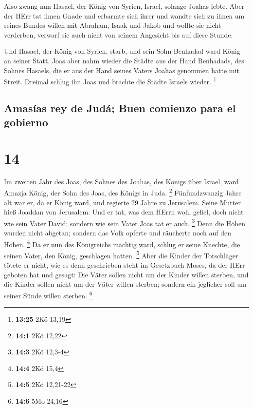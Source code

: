  Also zwang nun Hasael, der König von Syrien, Israel,
solange Joahas lebte.  Aber der HErr tat ihnen Gnade und
erbarmte sich ihrer und wandte sich zu ihnen um seines Bundes willen mit
Abraham, Isaak und Jakob und wollte sie nicht verderben, verwarf sie
auch nicht von seinem Angesicht bis auf diese Stunde.

 Und Hasael, der König von Syrien, starb, und sein Sohn
Benhadad ward König an seiner Statt.  Joas aber nahm
wieder die Städte aus der Hand Benhadads, des Sohnes Hasaels, die er aus
der Hand seines Vaters Joahas genommen hatte mit Streit. Dreimal schlug
ihn Joas und brachte die Städte Israels wieder. \footnote{\textbf{13:25}
  2Kö 13,19}

\hypertarget{amasuxedas-rey-de-juduxe1-buen-comienzo-para-el-gobierno}{%
\subsection{Amasías rey de Judá; Buen comienzo para el
gobierno}\label{amasuxedas-rey-de-juduxe1-buen-comienzo-para-el-gobierno}}

\hypertarget{section-13}{%
\section{14}\label{section-13}}

 Im zweiten Jahr des Joas, des Sohnes des Joahas, des
Königs über Israel, ward Amazja König, der Sohn des Joas, des Königs in
Juda. \footnote{\textbf{14:1} 2Kö 12,22}  Fünfundzwanzig
Jahre alt war er, da er König ward, und regierte 29 Jahre zu Jerusalem.
Seine Mutter hieß Joaddan von Jerusalem.  Und er tat, was
dem HErrn wohl gefiel, doch nicht wie sein Vater David; sondern wie sein
Vater Joas tat er auch. \footnote{\textbf{14:3} 2Kö 12,3-4}
 Denn die Höhen wurden nicht abgetan; sondern das Volk
opferte und räucherte noch auf den Höhen. \footnote{\textbf{14:4} 2Kö
  15,4}  Da er nun des Königreichs mächtig ward, schlug er
seine Knechte, die seinen Vater, den König, geschlagen hatten.
\footnote{\textbf{14:5} 2Kö 12,21-22}  Aber die Kinder der
Totschläger tötete er nicht, wie es denn geschrieben steht im Gesetzbuch
Moses, da der HErr geboten hat und gesagt: Die Väter sollen nicht um der
Kinder willen sterben, und die Kinder sollen nicht um der Väter willen
sterben; sondern ein jeglicher soll um seiner Sünde willen sterben.
\footnote{\textbf{14:6} 5Mo 24,16}

